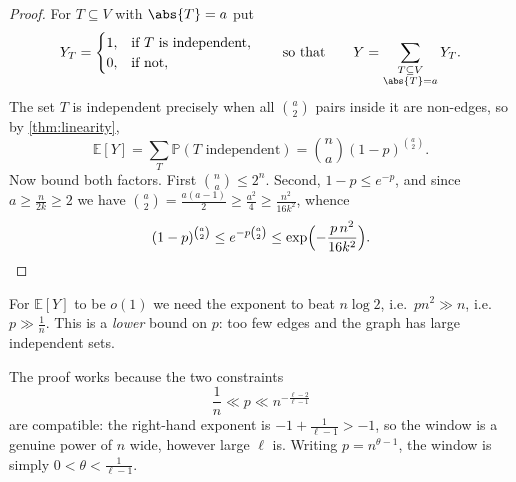 \begin{proof}
    For \(T \subseteq V\) with \(\abs{T} = a\) put
    \[
        Y_T = \begin{cases}
            1, & \text{if } T \text{ is independent}, \\
            0, & \text{if not},
        \end{cases}
        \qquad\text{so that}\qquad
        Y = \sum_{\substack{T \subseteq V \\ \abs{T} = a}} Y_T .
    \]
    The set \(T\) is independent precisely when all \(\binom{a}{2}\) pairs inside it are non-edges, so by \autoref{thm:linearity},
    \[
        \mathbb{E}[Y] = \sum_{T} \mathbb{P}(T \text{ independent}) = \binom{n}{a} (1-p)^{\binom{a}{2}}.
    \]
    Now bound both factors. First \(\binom{n}{a} \le 2^{n}\). Second, \(1 - p \le e^{-p}\), and since \(a \ge \frac{n}{2k} \ge 2\) we have \(\binom{a}{2} = \frac{a(a-1)}{2} \ge \frac{a^{2}}{4} \ge \frac{n^{2}}{16k^{2}}\), whence
    \[
        (1-p)^{\binom{a}{2}} \le e^{- p \binom{a}{2}} \le \exp\Bigl( - \frac{p \, n^{2}}{16 k^{2}} \Bigr). \qedhere
    \]
\end{proof}

For \(\mathbb{E}[Y]\) to be \(o(1)\) we need the exponent to beat \(n \log 2\), i.e.\ \(p n^{2} \gg n\), i.e.\ \(p \gg \frac{1}{n}\). This is a \emph{lower} bound on \(p\): too few edges and the graph has large independent sets.

\begin{intuition}
    The proof works because the two constraints
    \[
        \frac{1}{n} \ll p \ll n^{-\frac{\ell-2}{\ell-1}}
    \]
    are compatible: the right-hand exponent is \(-1 + \frac{1}{\ell-1} > -1\), so the window is a genuine power of \(n\) wide, however large \(\ell\) is. Writing \(p = n^{\theta - 1}\), the window is simply \(0 < \theta < \frac{1}{\ell-1}\).
\end{intuition}
\begin{center}
\end{center}

